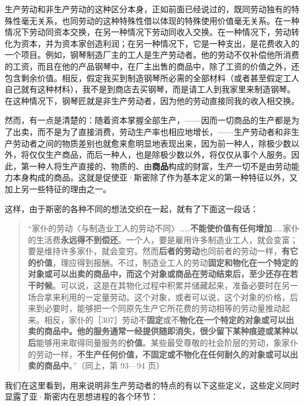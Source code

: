 生产劳动和非生产劳动的这种区分本身，正如前面已经说过的，既同劳动独有的特殊性毫无关系，也同劳动的这种特殊性借以体现的特殊使用价值毫无关系。在一种情况下劳动同资本交换，在另一种情况下劳动同收入交换。在一种情况下，劳动转化为资本，并为资本家创造利润；在另一种情况下，它是一种支出，是花费收入的一个项目。例如，钢琴制造厂主的工人是生产劳动者。他的劳动不仅补偿他所消费的工资，而且在他的产品钢琴中，在厂主出售的商品中，除了工资的价值之外，还包含剩余价值。相反，假定我买到制造钢琴所必需的全部材料（或者甚至假定工人自己就有这种材料），我不是到商店去买钢琴，而是请工人到我家里来制造钢琴。在这种情况下，钢琴匠就是非生产劳动者，因为他的劳动直接同我的收入相交换。


然而，有一点是清楚的：随着资本掌握全部生产，——因而一切商品的生产都是为了出卖，而不是为了直接消费，劳动生产率也相应地增长，——生产劳动者和非生产劳动者之间的物质差别也就愈来愈明显地表现出来，因为前一种人，除极少数以外，将仅仅生产商品，而后一种人，也是除极少数以外，将仅仅从事个人服务。因此，第一种人将生产直接的、物质的、由\textbf{商品}构成的财富，生产一切不是由劳动能力本身构成的商品。这就是促使亚·斯密除了作为基本定义的第一种特征以外，又加上另一些特征的理由之一。

这样，由于斯密的各种不同的想法交织在一起，就有了下面这一段话：

\begin{quote}“家仆的劳动〈与制造业工人的劳动不同〉……\textbf{不能使价值有任何增加}……家仆的生活费\textbf{永远得不到偿还}。一个人，要是雇用许多制造业工人，就会变富；要是维持许多家仆，就会变穷。然而\textbf{后者的劳动}也同前者的劳动一样，\textbf{有它的价值}，理应得到报酬。不过，制造业工人的劳动\textbf{固定和物化在一个特定的对象或可以出卖的商品中，而这个对象或商品在劳动结束后，至少还存在若干时候}。可以说，这是在其物化过程中积累并储藏起来，准备必要时在另一场合拿来利用的一定量劳动。这个对象，或者可以说，这个对象的价格，后来到必要时，能够把一个同原先生产它所花费的劳动相等的劳动量推动起来。相反，家仆的［307］劳动不\textbf{固定}或不\textbf{物化在一个特定的对象或可以出卖的商品中。他的服务通常一经提供随即消失，很少留下某种痕迹或某种以后}能够用来取得同量服务的\textbf{价值}。某些最受尊敬的社会阶层的劳动，象家仆的劳动一样，\textbf{不生产任何价值，不固定或不物化在任何耐久的对象或可以出卖的商品中}。”（同上，第 93—94 页）\end{quote}

我们在这里看到，用来说明非生产劳动者的特点的有以下这些定义，这些定义同时显露了亚·斯密内在思想进程的各个环节：

